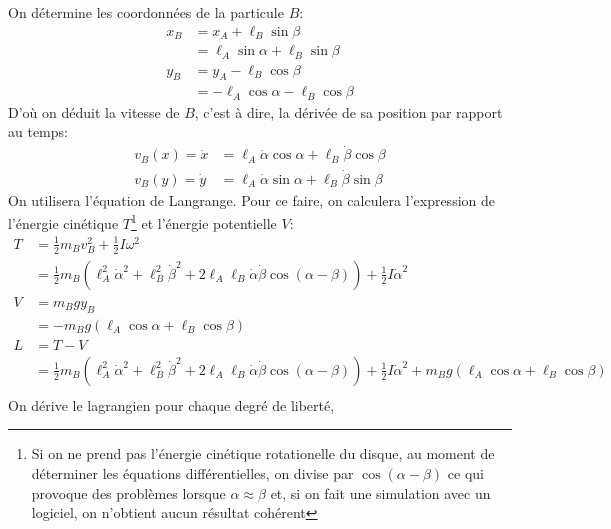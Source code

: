 \documentclass[10pt]{article}
\begin{document}
On détermine les coordonnées de la particule $B$:
\begin{align*}
x_B &= x_A + \ell_B\sin{\beta} \\
	&= \ell_A\sin{\alpha} + \ell_B\sin{\beta} \\
y_B &= y_A - \ell_B\cos{\beta} \\
	&= -\ell_A\cos{\alpha} - \ell_B\cos{\beta}
\end{align*}
D'où on déduit la vitesse de $B$, c'est à dire, la dérivée de sa position par rapport au temps:
\begin{align}
v_B(x) = \dot{x} &= \ell_A\dot{\alpha}\cos{\alpha} + \ell_B\dot{\beta}\cos{\beta} \\
v_B(y) = \dot{y} &= \ell_A\dot{\alpha}\sin{\alpha} + \ell_B\dot{\beta}\sin{\beta}
\end{align}
On utilisera l'équation de Langrange. Pour ce faire, on calculera l'expression de l'énergie cinétique $T$\footnote{Si on ne prend pas l'énergie cinétique rotationelle du disque, au moment de déterminer les équations différentielles, on divise par $\cos{(\alpha-\beta)}$ ce qui provoque des problèmes lorsque $\alpha \approx \beta$ et, si on fait une simulation avec un logiciel, on n'obtient aucun résultat cohérent} et l'énergie potentielle $V$:
\begin{align*}
T &= \frac12m_Bv_B^2 + \frac12I\omega^2 \\
	&= \frac12m_B\left(\ell_A^2\dot{\alpha}^2+\ell_B^2\dot{\beta}^2+ 2\ell_A\ell_B\dot{\alpha}\dot{\beta}\cos{(\alpha-\beta)}\right) + \frac12I\dot{\alpha}^2 \\
V &= m_Bgy_B \\
	&= -m_Bg\left(\ell_A\cos{\alpha} + \ell_B\cos{\beta}\right) \\
L &= T-V \\
 &= \frac12m_B\left(\ell_A^2\dot{\alpha}^2+\ell_B^2\dot{\beta}^2+ 2\ell_A\ell_B\dot{\alpha}\dot{\beta}\cos{(\alpha-\beta)}\right) + \frac12I\dot{\alpha}^2 + m_Bg\left(\ell_A\cos{\alpha} + \ell_B\cos{\beta}\right) \\
\end{align*}
On dérive le lagrangien pour chaque degré de liberté,
\end{document}
